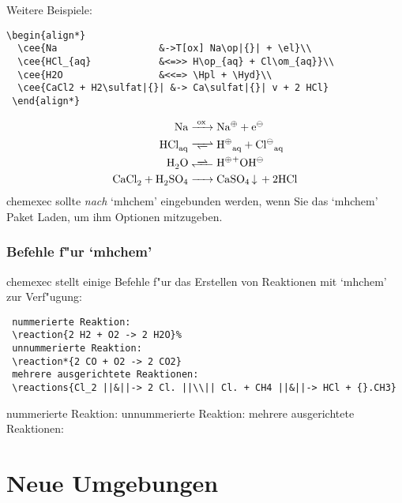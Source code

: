 \documentclass[a4paper,10pt,headsepline]{scrartcl}
\newcommand{\CEx}[1][8]{%
{\color{dunkelrot}\fontfamily{pag}\fontsize{#1}{#1}\selectfont chemexec}\xspace
}
\begin{document}
\noindent Weitere Beispiele:
\begin{lstlisting}[numbers=none,basicstyle=\normalsize\ttfamily]
 \begin{align*}
  \cee{Na                  &->T[ox] Na\op|{}| + \el}\\
  \cee{HCl_{aq}            &<=>> H\op_{aq} + Cl\om_{aq}}\\
  \cee{H2O                 &<<=> \Hpl + \Hyd}\\
  \cee{CaCl2 + H2\sulfat|{}| &-> Ca\sulfat|{}| v + 2 HCl}
 \end{align*}
\end{lstlisting}
\begin{align*}
 \cee{Na                  &->T[ox] Na\op{} + \el}\\
 \cee{HCl_{aq}            &<=>> H\op_{aq} + Cl\om_{aq}}\\
 \cee{H2O                 &<<=> \Hpl + \Hyd}\\
 \cee{CaCl2 + H2\sulfat{} &-> Ca\sulfat{} v + 2 HCl}
\end{align*}
\CEx sollte \emph{nach} `mhchem' eingebunden werden, wenn Sie das `mhchem' Paket Laden, um ihm Optionen mitzugeben.

\subsubsection{Befehle f"ur `mhchem'}
\CEx stellt einige Befehle f"ur das Erstellen von Reaktionen mit `mhchem' zur Verf"ugung:
\begin{lstlisting}
 nummerierte Reaktion:
 \reaction{2 H2 + O2 -> 2 H2O}%
 unnummerierte Reaktion:
 \reaction*{2 CO + O2 -> 2 CO2}
 mehrere ausgerichtete Reaktionen:
 \reactions{Cl_2 ||&||-> 2 Cl. ||\\|| Cl. + CH4 ||&||-> HCl + {}.CH3}
\end{lstlisting}
nummerierte Reaktion:
%
unnummerierte Reaktion:
mehrere ausgerichtete Reaktionen:

\section{Neue Umgebungen}
\end{document}
